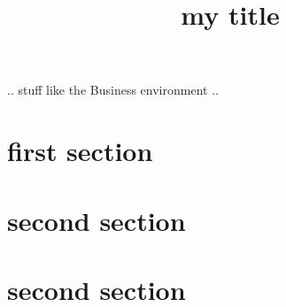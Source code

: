 \documentclass{test_latex_class}
\title{my title}
\begin{document}
\maketitle
\begin{minutes}
    .. stuff like the Business environment ..
    \begin{business}
    \item \lipsum[7]
    \item \lipsum[8]
    \end{business}

\end{minutes}

\section{first section}
\lipsum[1]

\lipsum[2]

\section{second section}
\lipsum[3]

\lipsum[4]

\section{second section}
\lipsum[5]

\lipsum[6]
\end{document}
